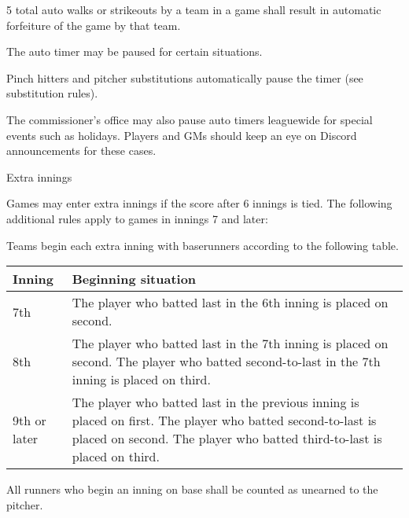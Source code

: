 \begin{deepEnumerate}
\begin{deepEnumerate}
\begin{deepEnumerate}
			\item 5 total auto walks or strikeouts by a team in a game shall result in automatic forfeiture of the game by that team.
		\end{deepEnumerate}
		\item The auto timer may be paused for certain situations.
		\begin{deepEnumerate}
			\item Pinch hitters and pitcher substitutions automatically pause the timer (see substitution rules). %
			\item The commissioner’s office may also pause auto timers leaguewide for special events such as holidays. 
			Players and GMs should keep an eye on Discord announcements for these cases.
		\end{deepEnumerate}
	\end{deepEnumerate}
	\item Extra innings
	\begin{deepEnumerate}
		\item Games may enter extra innings if the score after 6 innings is tied. 
		The following additional rules apply to games in innings 7 and later:
		\begin{deepEnumerate}
			\item Teams begin each extra inning with baserunners according to the following table.
			\begin{center}										                
				\begin{longtable}{|p{3cm}|p{8cm}|}
					\hline
					\textbf{Inning} & \textbf{Beginning situation}                                          \\
					\hline
					7th             & The player who batted last in the 6th inning is placed on second.     \\
					\hline
					8th             & The player who batted last in the 7th inning is placed on second.     
					The player who batted second-to-last in the 7th inning is placed on third. \\
					\hline
					9th or later    & The player who batted last in the previous inning is placed on first. 
					The player who batted second-to-last is placed on second.
					The player who batted third-to-last is placed on third. \\
					\hline
				\end{longtable}
			\end{center}
			\item All runners who begin an inning on base shall be counted as unearned to the pitcher. 

\end{deepEnumerate}
\end{deepEnumerate}
\end{deepEnumerate}
